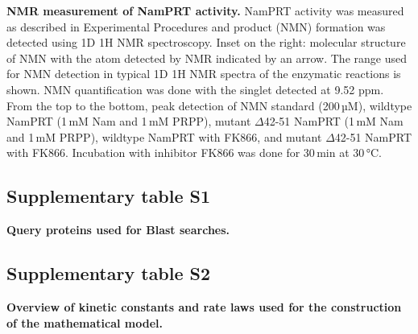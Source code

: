 \textbf{NMR measurement of NamPRT activity.} NamPRT activity was measured as described in Experimental Procedures and product (NMN) formation was detected using 1D 1H NMR spectroscopy. Inset on the right: molecular structure of NMN with the atom detected by NMR indicated by an arrow. The range used for NMN detection in typical 1D 1H NMR spectra of the enzymatic reactions is shown. NMN quantification was done with the singlet detected at 9.52 ppm. From the top to the bottom, peak detection of NMN standard (200\,µM), wildtype NamPRT (1\,mM Nam and 1\,mM PRPP), mutant $\Delta$42-51 NamPRT (1\,mM Nam and 1\,mM PRPP), wildtype NamPRT with FK866, and mutant $\Delta$42-51 NamPRT with FK866. Incubation with inhibitor FK866 was done for 30\,min at 30\,°C.


\subsection*{Supplementary table S1}

\textbf{Query proteins used for Blast searches.}


\subsection*{Supplementary table S2}

\textbf{Overview of kinetic constants and rate laws used for the construction of the mathematical model.}

